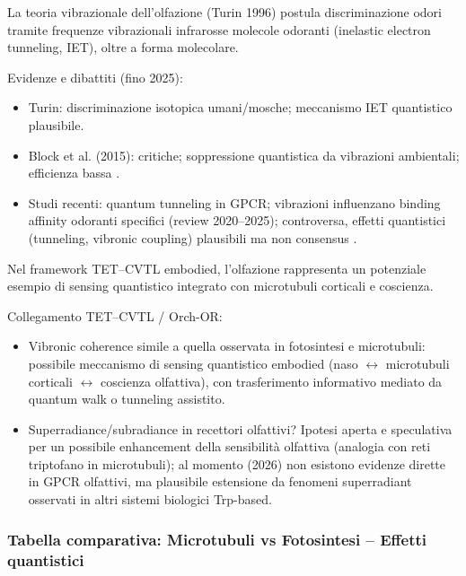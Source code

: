 \documentclass[11pt,a4paper]{article}
\let\oldcite\cite
\renewcommand{\cite}{\protect\oldcite}
\theoremstyle{plain}
\theoremstyle{definition}
\begin{document}
\vspace{0.2cm}

La teoria vibrazionale dell'olfazione (Turin 1996) postula discriminazione odori tramite frequenze vibrazionali infrarosse molecole odoranti (inelastic electron tunneling, IET), oltre a forma molecolare.

\vspace{0.2cm}

Evidenze e dibattiti (fino 2025):
\begin{itemize}
    \item Turin: discriminazione isotopica umani/mosche; meccanismo IET quantistico plausibile.
    \item Block et al. (2015): critiche; soppressione quantistica da vibrazioni ambientali; efficienza bassa \cite{Block2015}.
    \item Studi recenti: quantum tunneling in GPCR; vibrazioni influenzano binding affinity odoranti specifici (review 2020–2025); controversa, effetti quantistici (tunneling, vibronic coupling) plausibili ma non consensus \cite{Szczesniak2025}.
\end{itemize}

\vspace{0.2cm}

Nel framework TET--CVTL embodied, l'olfazione rappresenta un potenziale esempio di sensing quantistico integrato con microtubuli corticali e coscienza.

Collegamento TET--CVTL / Orch-OR:
\begin{itemize}
    \item Vibronic coherence simile a quella osservata in fotosintesi e microtubuli: possibile meccanismo di sensing quantistico embodied (naso $\leftrightarrow$ microtubuli corticali $\leftrightarrow$ coscienza olfattiva), con trasferimento informativo mediato da quantum walk o tunneling assistito.
    \item Superradiance/subradiance in recettori olfattivi? Ipotesi aperta e speculativa per un possibile enhancement della sensibilità olfattiva (analogia con reti triptofano in microtubuli); al momento (2026) non esistono evidenze dirette in GPCR olfattivi, ma plausibile estensione da fenomeni superradiant osservati in altri sistemi biologici Trp-based.
\end{itemize}
\vspace{0.4cm}

\subsubsection{Tabella comparativa: Microtubuli vs Fotosintesi – Effetti quantistici}
\end{document}
